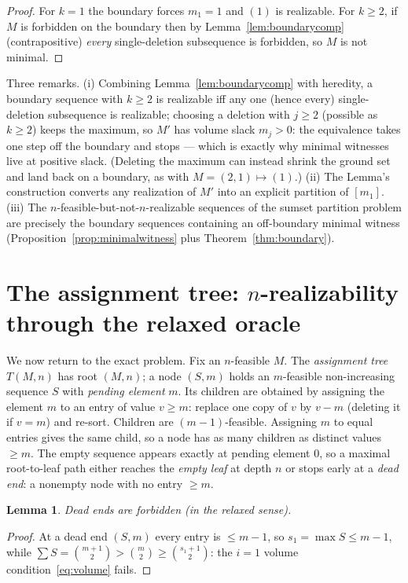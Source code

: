 \documentclass[11pt]{article}
\newtheorem{lemma}[theorem]{Lemma}
\theoremstyle{definition}
\theoremstyle{remark}
\newcommand{\intv}[1]{[#1]}
\begin{document}
\begin{proof}
For $k=1$ the boundary forces $m_1=1$ and $(1)$ is realizable. For $k\ge2$, if $M$
is forbidden on the boundary then by Lemma~\ref{lem:boundarycomp} (contrapositive)
\emph{every} single-deletion subsequence is forbidden, so $M$ is not minimal.
\end{proof}

Three remarks. (i) Combining Lemma~\ref{lem:boundarycomp} with heredity, a boundary
sequence with $k\ge2$ is realizable iff any one (hence every) single-deletion
subsequence is realizable; choosing a deletion with $j\ge2$ (possible as $k\ge2$)
keeps the maximum, so $M'$ has volume slack $m_j>0$: the equivalence takes one step
off the boundary and stops --- which is exactly why minimal witnesses live at
positive slack. (Deleting the maximum can instead shrink the ground set and land
back on a boundary, as with $M=(2,1)\mapsto(1)$.) (ii) The Lemma's construction converts any realization of $M'$ into
an explicit partition of $\intv{m_1}$. (iii) The $n$-feasible-but-not-$n$-realizable
sequences of the sumset partition problem are precisely the boundary sequences
containing an off-boundary minimal witness (Proposition~\ref{prop:minimalwitness}
plus Theorem~\ref{thm:boundary}).

\section{The assignment tree: $n$-realizability through the relaxed
oracle}\label{sec:tree}

We now return to the exact problem. Fix an $n$-feasible $M$. The \emph{assignment
tree} $T(M,n)$ has root $(M,n)$; a node $(S,m)$ holds an $m$-feasible non-increasing
sequence $S$ with \emph{pending element} $m$. Its children are obtained by assigning
the element $m$ to an entry of value $v\ge m$: replace one copy of $v$ by $v-m$
(deleting it if $v=m$) and re-sort. Children are $(m-1)$-feasible. Assigning $m$ to
equal entries gives the same child, so a node has as many children as distinct
values $\ge m$. The empty sequence appears exactly at pending element $0$, so a
maximal root-to-leaf path either reaches the \emph{empty leaf} at depth $n$ or stops
early at a \emph{dead end}: a nonempty node with no entry $\ge m$.

\begin{lemma}\label{lem:deadend}
Dead ends are forbidden (in the relaxed sense).
\end{lemma}

\begin{proof}
At a dead end $(S,m)$ every entry is $\le m-1$, so $s_1=\max S\le m-1$, while
$\sum S=\binom{m+1}{2}>\binom{m}{2}\ge\binom{s_1+1}{2}$: the $i=1$ volume
condition~\eqref{eq:volume} fails.
\end{proof}
\end{document}
